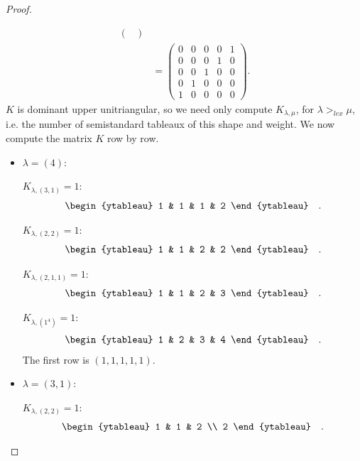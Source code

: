 \documentclass[12pt]{extarticle}
\newcommand{\<}{\langle}
\renewcommand{\>}{\rangle}
\theoremstyle{definition}
\begin{document}
\begin{proof}
\begin{enumerate}
\begin{align*}
\begin{pmatrix}
      \end{pmatrix} \\
      &=
      \begin{pmatrix}
        0 & 0 & 0 & 0 & 1 \\
        0 & 0 & 0 & 1 & 0 \\
        0 & 0 & 1 & 0 & 0 \\
        0 & 1 & 0 & 0 & 0 \\
        1 & 0 & 0 & 0 & 0
      \end{pmatrix}.
    \end{align*}
    $K$ is dominant upper unitriangular, so we need only compute $K_{\lambda,\mu}$, for $\lambda>_{lex} \mu$, i.e. the number of semistandard tableaux of this shape and weight. We now compute the matrix $K$ row by row.
    \begin{itemize}
    \item
      $\lambda = (4)$:

      $K_{\lambda, (3,1)} = 1$:
      \begin{align*}
        \begin{ytableau}
          1 & 1 & 1 & 2 
        \end{ytableau}\quad.
      \end{align*}

      $K_{\lambda, (2,2)} = 1$:
      \begin{align*}
        \begin{ytableau}
          1 & 1 & 2 & 2 
        \end{ytableau}\quad.
      \end{align*}

      $K_{\lambda, (2,1,1)} = 1$:
      \begin{align*}
        \begin{ytableau}
          1 & 1 & 2 & 3 
        \end{ytableau}\quad.
      \end{align*}

      $K_{\lambda, (1^4)} = 1$:
      \begin{align*}
        \begin{ytableau}
          1 & 2 & 3 & 4 
        \end{ytableau}\quad.
      \end{align*}
      The first row is $(1,1,1,1,1)$.

    \item
      $\lambda=(3,1)$:
      
      $K_{\lambda, (2,2)} = 1$:
      \begin{align*}
        \begin{ytableau}
          1 & 1 & 2 \\
          2
        \end{ytableau}\quad.
      \end{align*}


\end{itemize}
\end{enumerate}
\end{proof}
\end{document}
